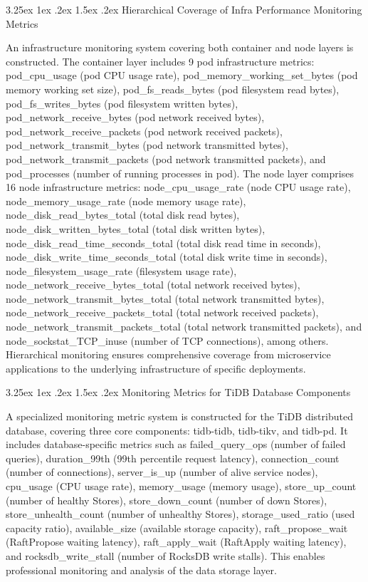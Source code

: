 \documentclass[10pt]{article}
\makeatletter
\renewcommand{\paragraph}{%
    \@startsection{paragraph}{4}{\z@}%
    {3.25ex \@plus1ex \@minus.2ex}%
    {1.5ex \@plus.2ex}%
    {\normalfont\normalsize\itshape}%
}
\makeatother
\begin{document}
\paragraph{Hierarchical Coverage of Infra Performance Monitoring Metrics}

An infrastructure monitoring system covering both container and node layers is constructed. The container layer includes 9 pod infrastructure metrics: pod\_cpu\_usage (pod CPU usage rate), pod\_memory\_working\_set\_bytes (pod memory working set size), pod\_fs\_reads\_bytes (pod filesystem read bytes), pod\_fs\_writes\_bytes (pod filesystem written bytes), pod\_network\_receive\_bytes (pod network received bytes), pod\_network\_receive\_packets (pod network received packets), pod\_network\_transmit\_bytes (pod network transmitted bytes), pod\_network\_transmit\_packets (pod network transmitted packets), and pod\_processes (number of running processes in pod). The node layer comprises 16 node infrastructure metrics: node\_cpu\_usage\_rate (node CPU usage rate), node\_memory\_usage\_rate (node memory usage rate), node\_disk\_read\_bytes\_total (total disk read bytes), node\_disk\_written\_bytes\_total (total disk written bytes), node\_disk\_read\_time\_seconds\_total (total disk read time in seconds), node\_disk\_write\_time\_seconds\_total (total disk write time in seconds), node\_filesystem\_usage\_rate (filesystem usage rate), node\_network\_receive\_bytes\_total (total network received bytes), node\_network\_transmit\_bytes\_total (total network transmitted bytes), node\_network\_receive\_packets\_total (total network received packets), node\_network\_transmit\_packets\_total (total network transmitted packets), and node\_sockstat\_TCP\_inuse (number of TCP connections), among others. Hierarchical monitoring ensures comprehensive coverage from microservice applications to the underlying infrastructure of specific deployments.

\paragraph{Monitoring Metrics for TiDB Database Components}

A specialized monitoring metric system is constructed for the TiDB distributed database, covering three core components: tidb-tidb, tidb-tikv, and tidb-pd. It includes database-specific metrics such as failed\_query\_ops (number of failed queries), duration\_99th (99th percentile request latency), connection\_count (number of connections), server\_is\_up (number of alive service nodes), cpu\_usage (CPU usage rate), memory\_usage (memory usage), store\_up\_count (number of healthy Stores), store\_down\_count (number of down Stores), store\_unhealth\_count (number of unhealthy Stores), storage\_used\_ratio (used capacity ratio), available\_size (available storage capacity), raft\_propose\_wait (RaftPropose waiting latency), raft\_apply\_wait (RaftApply waiting latency), and rocksdb\_write\_stall (number of RocksDB write stalls). This enables professional monitoring and analysis of the data storage layer.
\end{document}
